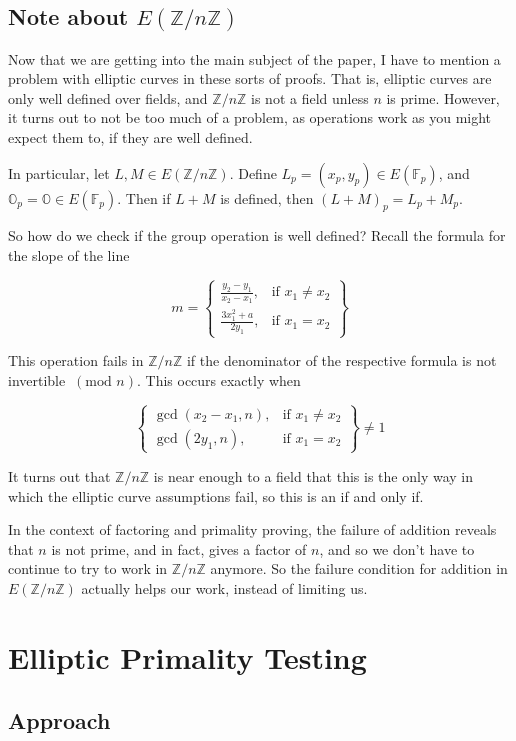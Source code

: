 \documentclass[]{article}
\newcommand{\Z}{\mathbb{Z}}
\newcommand{\OS}{\mathbb{O}}
\newcommand{\ZMZ}[1]{\Z/#1\Z}
\newcommand{\F}{\mathbb{F}}
\newcommand{\Mod}[1]{\ (\text{mod }#1)}
\begin{document}
\subsection{Note about $E(\ZMZ{n})$}

Now that we are getting into the main subject of the paper, I have to mention a problem with elliptic curves in these sorts of proofs. That is, elliptic curves are only well defined over fields, and $\ZMZ{n}$ is not a field unless $n$ is prime. However, it turns out to not be too much of a problem, as operations work as you might expect them to, if they are well defined.

In particular, let $L,M \in E(\ZMZ{n})$. Define $L_p = (x_p,y_p) \in E(\F_p)$, and $\OS_p = \OS \in E(\F_p)$. Then if $L+M$ is defined, then $(L+M)_p = L_p + M_p$.

So how do we check if the group operation is well defined? Recall the formula for the slope of the line

\[
m = \left\{\begin{array}{lr}
\frac{y_2-y_1}{x_2-x_1}, & \text{if } x_1 \ne x_2 \\
\frac{3x_1^2+a}{2y_1}, & \text{if } x_1 = x_2
\end{array}\right\}
\]

This operation fails in $\ZMZ{n}$ if the denominator of the respective formula is not invertible $\Mod{n}$. This occurs exactly when

\[
\left\{\begin{array}{lr}
\gcd(x_2-x_1,n), & \text{if } x_1 \ne x_2 \\
\gcd(2y_1,n), & \text{if } x_1 = x_2
\end{array}\right\}
\ne 1
\]

It turns out that $\ZMZ{n}$ is near enough to a field that this is the only way in which the elliptic curve assumptions fail, so this is an if and only if.

In the context of factoring and primality proving, the failure of addition reveals that $n$ is not prime, and in fact, gives a factor of $n$, and so we don't have to continue to try to work in $\ZMZ{n}$ anymore. So the failure condition for addition in $E(\ZMZ{n})$ actually helps our work, instead of limiting us.


\section{Elliptic Primality Testing}

\subsection{Approach}
\end{document}
